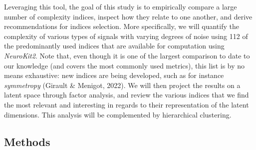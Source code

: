 \documentclass[
  man]{apa6}
\begin{document}
Leveraging this tool, the goal of this study is to empirically compare a large number of complexity indices, inspect how they relate to one another, and derive recommendations for indices selection. More specifically, we will quantify the complexity of various types of signals with varying degrees of noise using 112 of the predominantly used indices that are available for computation using \emph{NeuroKit2}. Note that, even though it is one of the largest comparison to date to our knowledge (and covers the most commonly used metrics), this list is by no means exhaustive: new indices are being developed, such as for instance \emph{symmetropy} (Girault \& Menigot, 2022). We will then project the results on a latent space through factor analysis, and review the various indices that we find the most relevant and interesting in regards to their representation of the latent dimensions. This analysis will be complemented by hierarchical clustering.

\hypertarget{methods}{%
\subsection{Methods}\label{methods}}
\end{document}
